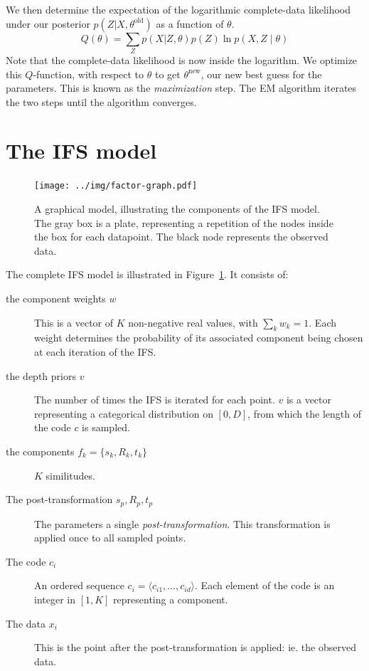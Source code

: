 \documentclass[10pt,a4paper,oneside]{article}
\theoremstyle{definition}
\theoremstyle{definition}
\begin{document}
We then determine the expectation of the logarithmic complete-data likelihood under  our posterior $p(Z|X, \theta^\text{old})$ as a function of $\theta$.
\[
Q(\theta) = \sum_Z p(X|Z, \theta)p(Z) \ln p(X, Z \mid \theta)
\]  
Note that the complete-data likelihood is now inside the logarithm. We optimize this $Q$-function, with respect to $\theta$ to get $\theta^\text{new}$, our new best guess for the parameters. This is known as the \emph{maximization} step. The EM algorithm iterates the two steps until the algorithm converges.

\section{The IFS model}

\begin{figure}[t]
  \center
  \texttt{[image: ../img/factor-graph.pdf]}
  \caption{A graphical model, illustrating the components of the IFS model. The gray box is a plate, representing a repetition of the nodes inside the box for each datapoint. The black node represents the observed data.}
  \label{figure:ifs-diagram}
\end{figure}

The complete IFS model is illustrated in Figure~\ref{figure:ifs-diagram}. It consists of:
\begin{description}
\item[the component weights $w$] This is a vector of $K$ non-negative real values, with $\sum_k w_k = 1$. Each weight determines the probability of its associated component being chosen at each iteration of the IFS.
\item[the depth  priors $v$] The number of times the IFS is iterated for each point. $v$ is a vector representing a categorical distribution on $[0,D]$, from which the length of the code $c$ is sampled. 
\item[the components $f_k = \{s_k, R_k, t_k\}$] $K$ similitudes. 
\item[The post-transformation $s_p, R_p, t_p$] The parameters a single \emph{post-transformation}. This transformation is applied once to all sampled points.
\item[The code $c_i$] An ordered sequence $c_i = \langle c_{i1}, \ldots, c_{id} \rangle$. Each element of the code is an integer in $[1,K]$ representing a component. 
\item[The data $x_i$] This is the point after the post-transformation is applied: ie. the observed data.
\end{description}
\end{document}
